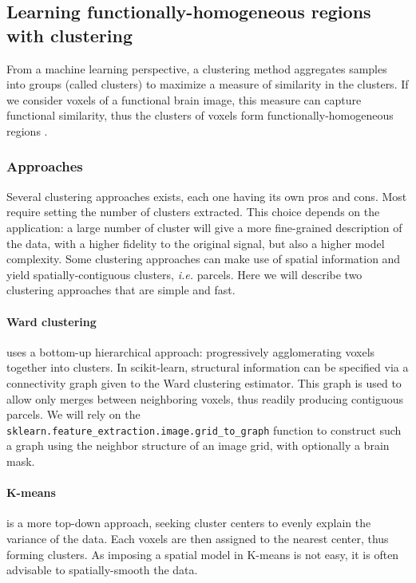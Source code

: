 \documentclass{frontiersSCNS} %
\begin{document}
\subsection{Learning functionally-homogeneous regions with clustering}
\label{clustering}

From a machine learning perspective, a clustering method aggregates 
samples into groups (called clusters) to maximize a measure of similarity in
the clusters. If we consider voxels of a functional brain image, this 
measure can capture functional similarity, thus the clusters of voxels
form functionally-homogeneous regions \citep{thirion2006}.

\subsubsection{Approaches}

Several clustering approaches exists, each one having its own pros and
cons. Most require setting the number of clusters extracted. This choice
depends on the application: a large number of cluster will give a more
fine-grained description of the data, with a higher fidelity to the
original signal, but also a higher model complexity. Some clustering
approaches can make use of spatial information and yield
spatially-contiguous clusters, \emph{i.e.} parcels. Here we will describe
two clustering approaches that are simple and fast.

\paragraph{Ward clustering} uses a bottom-up hierarchical approach:
progressively agglomerating voxels together into clusters. In
scikit-learn, structural information can be specified via a connectivity
graph given to the Ward clustering estimator. This graph is used to allow
only merges between neighboring voxels, thus readily producing contiguous
parcels. We will rely on the {\tt
sklearn.feature\_extraction.image.grid\_to\_graph} function to
construct such a graph using the neighbor structure of an image grid,
with optionally a brain mask.

\paragraph{K-means} is a more top-down approach, seeking cluster centers
to evenly explain the variance of the data. Each voxels are then assigned
to the nearest center, thus forming clusters. As imposing a spatial model
in K-means is not easy, it is often advisable to spatially-smooth the
data.
\end{document}
